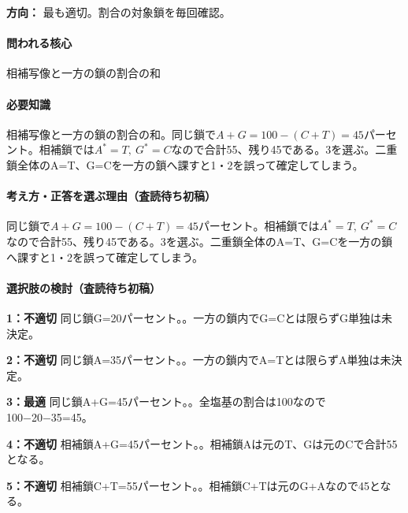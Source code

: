 \noindent\textbf{方向：} 最も適切。割合の対象鎖を毎回確認。\par

\paragraph{問われる核心} 相補写像と一方の鎖の割合の和

\paragraph{必要知識} 相補写像と一方の鎖の割合の和。同じ鎖で\(A+G=100-(C+T)=45\)パーセント。相補鎖では\(A^{\ast}=T,\ G^{\ast}=C\)なので合計55、残り45である。3を選ぶ。二重鎖全体のA=\allowbreak{}T、G=\allowbreak{}Cを一方の鎖へ課すと1・2を誤って確定してしまう。

\paragraph{考え方・正答を選ぶ理由（査読待ち初稿）} 同じ鎖で\(A+G=100-(C+T)=45\)パーセント。相補鎖では\(A^{\ast}=T,\ G^{\ast}=C\)なので合計55、残り45である。3を選ぶ。二重鎖全体のA=\allowbreak{}T、G=\allowbreak{}Cを一方の鎖へ課すと1・2を誤って確定してしまう。

\paragraph{選択肢の検討（査読待ち初稿）}\mbox{}\par

\noindent\textbf{1：不適切} 同じ鎖G=\allowbreak{}20パーセント。。一方の鎖内でG=\allowbreak{}Cとは限らずG単独は未決定。\par

\noindent\textbf{2：不適切} 同じ鎖A=\allowbreak{}35パーセント。。一方の鎖内でA=\allowbreak{}Tとは限らずA単独は未決定。\par

\noindent\textbf{3：最適} 同じ鎖A+G=\allowbreak{}45パーセント。。全塩基の割合は100なので100−20−35=\allowbreak{}45。\par

\noindent\textbf{4：不適切} 相補鎖A+G=\allowbreak{}45パーセント。。相補鎖Aは元のT、Gは元のCで合計55となる。\par

\noindent\textbf{5：不適切} 相補鎖C+T=\allowbreak{}55パーセント。。相補鎖C+Tは元のG+Aなので45となる。\par


